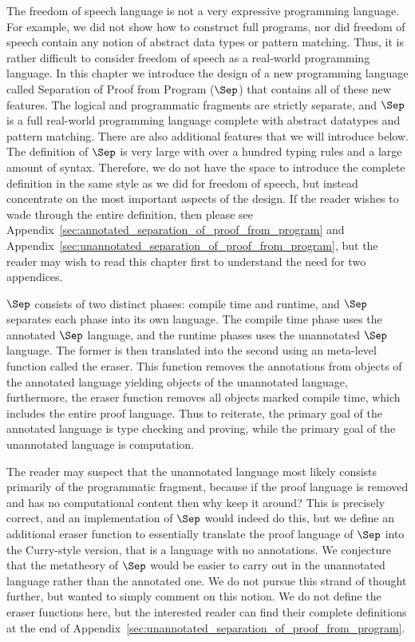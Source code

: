 The freedom of speech language is not a very expressive programming
language.  For example, we did not show how to construct full
programs, nor did freedom of speech contain any notion of abstract
data types or pattern matching.  Thus, it is rather difficult to
consider freedom of speech as a real-world programming language.  In
this chapter we introduce the design of a new programming language
called Separation of Proof from Program ($\Sep$) that contains all of
these new features.  The logical and programmatic fragments are
strictly separate, and $\Sep$ is a full real-world programming
language complete with abstract datatypes and pattern matching.  There
are also additional features that we will introduce below.  The
definition of $\Sep$ is very large with over a hundred typing rules
and a large amount of syntax.  Therefore, we do not have the space to
introduce the complete definition in the same style as we did for
freedom of speech, but instead concentrate on the most important
aspects of the design.  If the reader wishes to wade through the
entire definition, then please see
Appendix~\ref{sec:annotated_separation_of_proof_from_program} and
Appendix~\ref{sec:unannotated_separation_of_proof_from_program}, but
the reader may wish to read this chapter first to understand the need
for two appendices.

$\Sep$ consists of two distinct phases: compile time and runtime, and
$\Sep$ separates each phase into its own language.  The compile time
phase uses the annotated $\Sep$ language, and the runtime phases uses
the unannotated $\Sep$ language.  The former is then translated into
the second using an meta-level function called the eraser.  This
function removes the annotations from objects of the annotated
language yielding objects of the unannotated language, furthermore, the
eraser function removes all objects marked compile time, which
includes the entire proof language.  Thus to reiterate, the primary
goal of the annotated language is type checking and proving, while the
primary goal of the unannotated language is computation.  

The reader may suspect that the unannotated language most likely
consists primarily of the programmatic fragment, because if the proof
language is removed and has no computational content then why keep it
around?  This is precisely correct, and an implementation of $\Sep$
would indeed do this, but we define an additional eraser function to
essentially translate the proof language of $\Sep$ into the
Curry-style version, that is a language with no annotations.  We
conjecture that the metatheory of $\Sep$ would be easier to carry out
in the unannotated language rather than the annotated one.  We do not
pursue this strand of thought further, but wanted to simply comment on
this notion. We do not define the eraser functions here, but the
interested reader can find their complete definitions at the end of
Appendix~\ref{sec:unannotated_separation_of_proof_from_program}.

